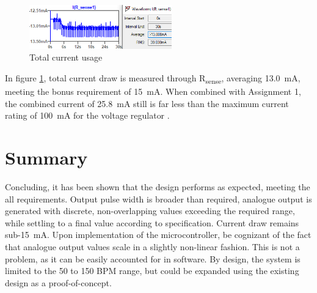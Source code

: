 \begin{figure}
\centering
\vspace{-0.3cm}
\includegraphics[width=0.55\textwidth]{./Figures/current}
\caption{Total current usage}
\label{fig:current}
\end{figure}
In figure \ref{fig:current}, total current draw is measured through R\textsubscript{sense}, averaging \SI{13.0}{mA}, meeting the bonus requirement of \SI{15}{mA}. When combined with Assignment 1, the combined current of \SI{25.8}{mA} still is far less than the maximum current rating of \SI{100}{mA} for the voltage regulator \cite{prev}. 

\section{Summary}\label{sec:temp_summary}
Concluding, it has been shown that the design performs as expected, meeting the all requirements. Output pulse width is broader than required, analogue output is generated with discrete, non-overlapping values exceeding the required range, while settling to a final value according to specification.  Current draw remains sub-\SI{15}{mA}. Upon implementation of the microcontroller, be cognizant of the fact that analogue output values scale in a slightly non-linear fashion. This is not a problem, as it can be easily accounted for in software. By design, the system is limited to the 50 to 150 BPM range, but could be expanded using the existing design as a proof-of-concept. 

